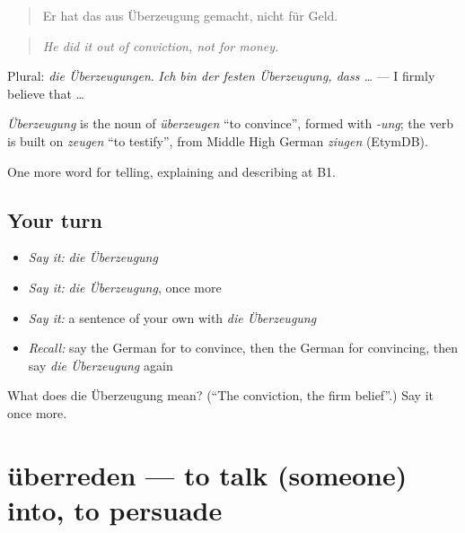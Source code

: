 \begin{quote}
Er hat das aus Überzeugung gemacht, nicht für Geld.
\end{quote}

\begin{quote}
\emph{He did it out of conviction, not for money.}
\end{quote}

Plural: \emph{die Überzeugungen}. \emph{Ich bin der festen Überzeugung, dass …} — I firmly believe that …

\begin{cousinweb}
\emph{Überzeugung} is the noun of \emph{überzeugen} \textquotedblleft{}to convince\textquotedblright{}, formed with \emph{-ung}; the verb is built on \emph{zeugen} \textquotedblleft{}to testify\textquotedblright{}, from Middle High German \emph{ziugen} (EtymDB).
\end{cousinweb}

\begin{grammarlens}[title={What you've built}]
One more word for telling, explaining and describing at B1.
\end{grammarlens}

\subsection*{Your turn}
\begin{itemize}
\raggedright
  \item \emph{Say it:} \emph{die Überzeugung}
  \item \emph{Say it:} \emph{die Überzeugung}, once more
  \item \emph{Say it:} a sentence of your own with \emph{die Überzeugung}
  \item \emph{Recall:} say the German for to convince, then the German for convincing, then say \emph{die Überzeugung} again
\end{itemize}

\begin{tcolorbox}[breakable,colback=teal!4,colframe=teal!35!black,title={Before you move on}]
What does die Überzeugung mean? (\textquotedblleft{}The conviction, the firm belief\textquotedblright{}.) Say it once more.
\end{tcolorbox}
\section[überreden]{überreden — to talk (someone) into, to persuade}

